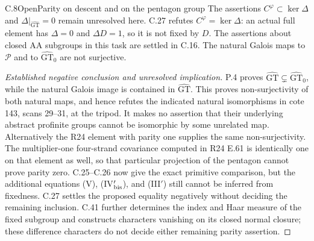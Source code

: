 \begin{statement}{C.8}{Open}{Parity on descent and on the pentagon group}
The assertions $C^\varphi\subset\ker\Delta$ and
$\Delta|_{\widehat{\mathrm{GT}}}=0$ remain unresolved here.
C.27 refutes $C^\varphi=\ker\Delta$: an actual full
element has $\Delta=0$ and $\Delta D=1$, so it is not
fixed by $D$.
The assertions about closed AA subgroups in this task are settled
in C.16. The natural Galois maps to $\mathcal P$ and to
$\widehat{\mathrm{GT}}_0$ are not surjective.
\end{statement}
\begin{proof}[Established negative conclusion and unresolved implication]
P.4 proves $\widehat{\mathrm{GT}}\subsetneq
\widehat{\mathrm{GT}}_0$, while the natural Galois image is contained
in $\widehat{\mathrm{GT}}$. This proves non-surjectivity of both
natural maps, and hence refutes the indicated natural isomorphisms
in cote 143, scans 29--31, at the tripod. It makes no assertion
that their underlying abstract profinite groups cannot be isomorphic
by some unrelated map. Alternatively the R24 element with parity
one supplies the same non-surjectivity. The multiplier-one
four-strand covariance computed in R24 E.61 is identically one on
that element as well, so that particular projection of the pentagon
cannot prove parity zero. C.25--C.26 now give the exact
primitive comparison, but the additional equations (V),
(IV$'_{\rm bis}$), and (III$'$) still cannot be inferred
from fixedness. C.27 settles the proposed equality
negatively without deciding the remaining inclusion.
C.41 further determines the index and Haar measure of the fixed
subgroup and constructs characters vanishing on its closed normal
closure; these difference characters do not decide either remaining
parity assertion.
\end{proof}

